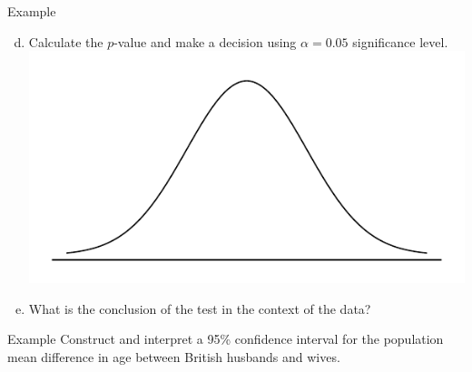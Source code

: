 \documentclass[10pt, fleqn]{beamer}
\begin{document}
\begin{frame}{Example}
\begin{enumerate}[(a)]
\setcounter{enumi}{3}
\item Calculate the $p$-value and make a decision using $\alpha = 0.05$ significance level.\\
\includegraphics[scale=0.35]{norm_draw.pdf}
\vspace{0.75cm}
\item What is the conclusion of the test in the context of the data?
\vspace{3.5cm}
\end{enumerate}
\end{frame}

\begin{frame}{Example}
\vspace{-4.75cm}
Construct and interpret a 95\% confidence interval for the population mean difference in age between British husbands and wives.
\end{frame}
\end{document}
